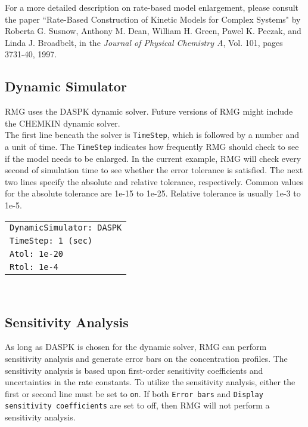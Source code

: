 \documentclass[12pt,letterpaper]{article}
\begin{document}
For a more detailed description on rate-based model enlargement, please
consult the paper ``Rate-Based Construction of Kinetic Models for Complex
Systems" by Roberta G. Susnow, Anthony M. Dean, William H. Green,
Pawel K. Peczak, and Linda J. Broadbelt, in the \textit{Journal of Physical Chemistry
A}, Vol. 101, pages 3731-40, 1997.

\subsection{Dynamic Simulator}

RMG uses the DASPK dynamic solver. Future versions of RMG might include
the CHEMKIN dynamic solver. \\

The first line beneath the solver is \texttt{TimeStep}, which is followed by a number
and a unit of time. The \texttt{TimeStep} indicates how frequently RMG should
check to see if the model needs to be enlarged. In the current example, RMG
will check every second of simulation time to see whether the error tolerance
is satisfied. The next two lines specify the absolute and relative tolerance,
respectively. Common values for the absolute tolerance are 1e-15 to 1e-25.
Relative tolerance is usually 1e-3 to 1e-5. \\

\begin{tabular}{l}
\texttt{DynamicSimulator: DASPK} \\
\texttt{TimeStep: 1 (sec)} \\
\texttt{Atol: 1e-20} \\
\texttt{Rtol: 1e-4} \\
\end{tabular}\\


\subsection{Sensitivity Analysis}

As long as DASPK is chosen for the dynamic solver, RMG can perform
sensitivity analysis and generate error bars on the concentration profiles.
The sensitivity analysis is based upon first-order sensitivity coefficients and
uncertainties in the rate constants. To utilize the sensitivity analysis, either
the first or second line must be set to \texttt{on}. If both \texttt{Error bars} and \texttt{Display sensitivity coefficients} are set to off, then RMG will not perform a sensitivity
analysis.\\
\end{document}
